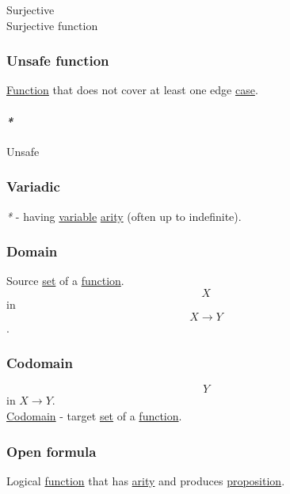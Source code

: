 \documentclass[11pt]{article}
\begin{document}
\label{org7992b12}Surjective\\
\label{orgf436f53}Surjective function\\

\subsubsection{\label{orgacb8c00}Unsafe function}
\label{sec:orgbf39507}
\hyperref[orgeb5cddb]{Function} that does not cover at least one edge \hyperref[org96bceb0]{case}.\\

\paragraph{\emph{*}}
\label{sec:org255a092}

\label{org76b942a}Unsafe\\

\subsubsection{\label{org6ab758e}Variadic}
\label{sec:orgcd66462}
\emph{*} - having \hyperref[org301bab5]{variable} \hyperref[orgcb1a08f]{arity} (often up to indefinite).\\

\subsubsection{\label{orgf784585}Domain}
\label{sec:orge08b5d9}
Source \hyperref[orgbed80ba]{set} of a \hyperref[orgeb5cddb]{function}.\\
$$ X $$ in $$ X \to Y $$.\\

\subsubsection{\label{orgee70232}Codomain}
\label{sec:org4afeb61}
$$ Y $$ in \(X \to Y\).\\
\hyperref[orgee70232]{Codomain} - target \hyperref[orgbed80ba]{set} of a \hyperref[orgeb5cddb]{function}.\\

\subsubsection{\label{orga19fd73}Open formula}
\label{sec:orga5d3fb0}
Logical \hyperref[orgeb5cddb]{function} that has \hyperref[orgcb1a08f]{arity} and produces \hyperref[org78bac32]{proposition}.\\
\end{document}
